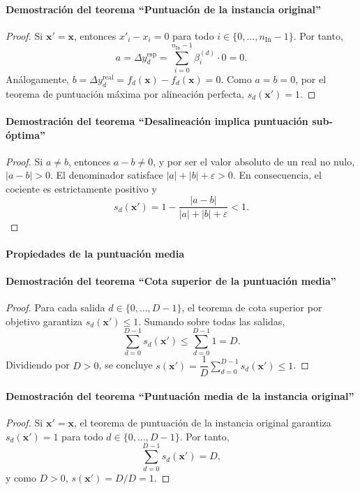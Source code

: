 \documentclass[12pt]{report} %
\begin{document}
\paragraph*{Demostración del teorema ``Puntuación de la instancia original''}
\begin{proof}
    Si $\mathbf{x}' = \mathbf{x}$, entonces $x'_i - x_i = 0$ para todo $i \in \{0, \ldots, n_{\text{In}}-1\}$. Por tanto,
    $$a = \Delta y_d^{\text{esp}} = \sum_{i=0}^{n_{\text{In}}-1} \beta_i^{(d)} \cdot 0 = 0.$$
    Análogamente, $b = \Delta y_d^{\text{real}} = f_d(\mathbf{x}) - f_d(\mathbf{x}) = 0$. Como $a = b = 0$, por el teorema de puntuación máxima por alineación perfecta, $s_d(\mathbf{x}') = 1$.
\end{proof}

\paragraph*{Demostración del teorema ``Desalineación implica puntuación sub-óptima''}
\begin{proof}
    Si $a \neq b$, entonces $a - b \neq 0$, y por ser el valor absoluto de un real no nulo, $|a - b| > 0$. El denominador satisface $|a| + |b| + \varepsilon > 0$. En consecuencia, el cociente es estrictamente positivo y
    $$s_d(\mathbf{x}') = 1 - \frac{|a - b|}{|a| + |b| + \varepsilon} < 1.$$
\end{proof}

\paragraph*{Propiedades de la puntuación media}

\paragraph*{Demostración del teorema ``Cota superior de la puntuación media''}
\begin{proof}
    Para cada salida $d \in \{0, \ldots, D-1\}$, el teorema de cota superior por objetivo garantiza $s_d(\mathbf{x}') \leq 1$. Sumando sobre todas las salidas,
    $$\sum_{d=0}^{D-1} s_d(\mathbf{x}') \leq \sum_{d=0}^{D-1} 1 = D.$$
    Dividiendo por $D > 0$, se concluye $s(\mathbf{x}') = \dfrac{1}{D}\sum_{d=0}^{D-1} s_d(\mathbf{x}') \leq 1$.
\end{proof}

\paragraph*{Demostración del teorema ``Puntuación media de la instancia original''}
\begin{proof}
    Si $\mathbf{x}' = \mathbf{x}$, el teorema de puntuación de la instancia original garantiza $s_d(\mathbf{x}') = 1$ para todo $d \in \{0, \ldots, D-1\}$. Por tanto,
    $$\sum_{d=0}^{D-1} s_d(\mathbf{x}') = D,$$
    y como $D > 0$, $s(\mathbf{x}') = D/D = 1$.
\end{proof}
\end{document}
